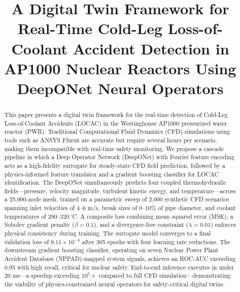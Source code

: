 \documentclass[conference]{IEEEtran}
\begin{document}
\title{A Digital Twin Framework for Real-Time Cold-Leg Loss-of-Coolant Accident Detection in AP1000 Nuclear Reactors Using DeepONet Neural Operators}

\author{
}

\maketitle

\begin{abstract}
This paper presents a digital twin framework for the real-time detection of Cold-Leg Loss-of-Coolant Accidents (LOCAC) in the Westinghouse AP1000 pressurized water reactor (PWR). Traditional Computational Fluid Dynamics (CFD) simulations using tools such as ANSYS Fluent are accurate but require several hours per scenario, making them incompatible with real-time safety monitoring. We propose a cascade pipeline in which a Deep Operator Network (DeepONet) with Fourier feature encoding acts as a high-fidelity surrogate for steady-state CFD field prediction, followed by a physics-informed feature translator and a gradient boosting classifier for LOCAC identification. The DeepONet simultaneously predicts four coupled thermohydraulic fields—pressure, velocity magnitude, turbulent kinetic energy, and temperature—across a 25,000-node mesh, trained on a parametric sweep of 2,000 synthetic CFD scenarios spanning inlet velocities of 4–6 m/s, break sizes of 0–10\% of pipe diameter, and coolant temperatures of 290–320\,$^\circ$C. A composite loss combining mean squared error (MSE), a Sobolev gradient penalty ($\beta = 0.1$), and a divergence-free constraint ($\lambda = 0.01$) enforces physical consistency during training. The surrogate model converges to a final validation loss of $9.11\times10^{-4}$ after 305 epochs with four learning rate reductions. The downstream gradient boosting classifier, operating on seven Nuclear Power Plant Accident Database (NPPAD)-mapped system signals, achieves an ROC-AUC exceeding 0.95 with high recall, critical for nuclear safety. End-to-end inference executes in under 20 ms—a speedup exceeding $10^{5}\times$ compared to full CFD simulation—demonstrating the viability of physics-constrained neural operators for safety-critical digital twins.
\end{abstract}
\end{document}

